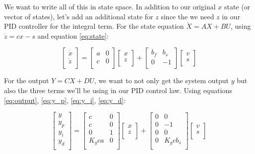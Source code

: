 \documentclass[10pt,letterpaper]{article}
\begin{document}
We want to write all of this in state space. In addition to our original $x$ state (or vector of states), let's add an additional state for $z$ since the we need $z$ in our PID controller for the integral term. For the state equation $\dot{X} = AX + BU$, using $\dot{z} = cx - s$ and equation \ref{eq:state}:

\begin{equation} \label{eq:complete_state}
\begin{bmatrix}
    \dot{x} \\
    \dot{z} \\
\end{bmatrix} =
\begin{bmatrix}
	a & 0 \\
	c & 0 \\
\end{bmatrix}
\begin{bmatrix}
	x \\
	z \\
\end{bmatrix} + 
\begin{bmatrix}
	b_f & b_s \\
	0 & -1 \\
\end{bmatrix}
\begin{bmatrix}
	v \\
	s \\
\end{bmatrix}
\end{equation}

For the output $Y = CX + DU$, we want to not only get the system output $y$ but also the three terms we'll be using in our PID control law. Using equations \ref{eq:output}, \ref{eq:y_p}, \ref{eq:y_i}, \ref{eq:y_d}:

\begin{equation} \label{eq:complete_output}
\begin{bmatrix}
	y \\
	y_p \\
	y_i \\
	y_d \\
\end{bmatrix} =
\begin{bmatrix}
	c & 0 \\
	c & 0 \\
	0 & 1 \\
	K_g c a & 0 \\
\end{bmatrix}
\begin{bmatrix}
	x \\
	z \\
\end{bmatrix} + 
\begin{bmatrix}
	0 & 0 \\
	0 & -1 \\
	0 & 0 \\
	0 & K_g c b_s \\
\end{bmatrix}
\begin{bmatrix}
	v \\
	s \\
\end{bmatrix}
\end{equation}
\end{document}
